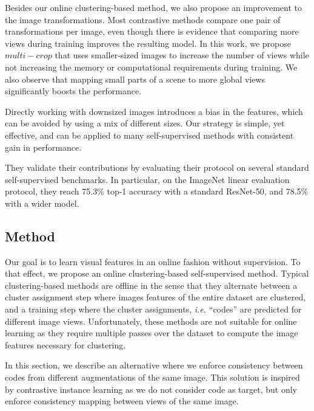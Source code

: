\documentclass{tufte-handout}
\begin{document}
Besides our online clustering-based method, we also propose an improvement to the image transformations.
Most contrastive methods compare one pair of transformations per image, even though there is evidence that comparing more views during training improves the resulting model.
In this work, we propose $multi-crop$ that uses smaller-sized images to increase the number of views while not increasing the memory or computational requirements during training.
We also observe that mapping small parts of a scene to more global views significantly boosts the performance.

Directly working with downsized images introduces a bias in the features, which can be avoided by using a mix of different sizes.
Our strategy is simple, yet effective, and can be applied to many self-supervised methods with consistent gain in performance.

They validate their contributions by evaluating their protocol on several standard self-supervised benchmarks.
In particular, on the ImageNet linear evaluation protocol, they reach 75.3\% top-1 accuracy with a standard ResNet-50, and 78.5\% with a wider model. 
\subsection{Method}\label{sec:method}
Our goal is to learn visual features in an online fashion without supervision. 
To that effect, we propose an online clustering-based self-supervised method.
Typical clustering-based methods are offline in the sense that they alternate between a cluster assignment step where images features of the entire dataset are clustered, 
and a training step where the cluster assignments, \textit{i.e.} ``codes'' are predicted for different image views.
Unfortunately, these methods are not suitable for online learning as they require multiple passes over the dataset to compute the image features necessary for clustering.

In this section, we describe an alternative where we enforce consistency between codes from different augmentations of the same image.
This solution is inspired by contrastive instance learning as we do not consider code as target, but only enforce consistency mapping between views of the same image. 
\end{document}
